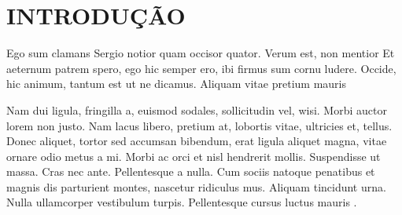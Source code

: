 
\chapter{INTRODUÇÃO}\label{introducao}

Ego sum clamans Sergio notior quam occisor quator. Verum est, non mentior Et aeternum patrem spero, ego hic semper ero, ibi firmus sum cornu ludere. Occide, hic animum, tantum est ut ne dicamus. Aliquam vitae pretium mauris \cite{AntonBivensDavis2007}


Nam dui ligula, fringilla a, euismod sodales, sollicitudin vel, wisi. Morbi auctor lorem non justo. Nam lacus libero, pretium at, lobortis vitae, ultricies et, tellus. Donec aliquet, tortor sed accumsan bibendum, erat ligula aliquet magna, vitae ornare odio metus a mi. Morbi ac orci et nisl hendrerit mollis. Suspendisse ut massa. Cras nec ante. Pellentesque a nulla. Cum sociis natoque penatibus et magnis dis parturient montes, nascetur ridiculus mus. Aliquam tincidunt urna. Nulla ullamcorper vestibulum turpis. Pellentesque cursus luctus mauris \cite{AntonBivensDavis2007,AntonBusby2006}. %



\lipsum[3-4]
